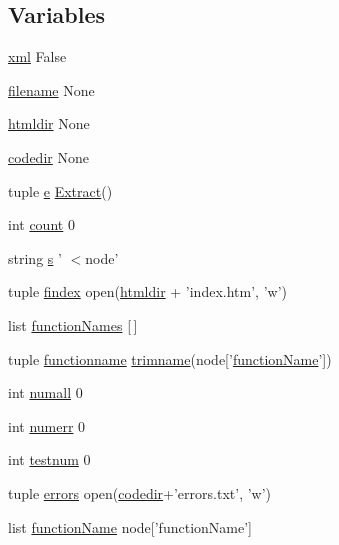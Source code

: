 \subsection*{Variables}
\begin{DoxyCompactItemize}
\item 
\hyperlink{namespaceextracttests_a6221337b9ed2dc702e37b3ecf75af370}{xml} False
\item 
\hyperlink{namespaceextracttests_ae8e72c8ddfad0acc854b69f255560652}{filename} None
\item 
\hyperlink{namespaceextracttests_a4802ed7c6c7398fd5bc6700a06be8056}{htmldir} None
\item 
\hyperlink{namespaceextracttests_a95eea71168be983462e5debd6ee1f3d8}{codedir} None
\item 
tuple \hyperlink{namespaceextracttests_a9a4c5d70c5d35e1c5a5c6963e1cc9c55}{e} \hyperlink{classextracttests_1_1_extract}{Extract}()
\item 
int \hyperlink{namespaceextracttests_afc0659f75fa16c14ec06fb99f56327ef}{count} 0
\item 
string \hyperlink{namespaceextracttests_a16068547f03c44075089cfcd0d9d384f}{s} ' $<$node'
\item 
tuple \hyperlink{namespaceextracttests_a0e689b33baed4a504201858c00f92221}{findex} open(\hyperlink{namespaceextracttests_a4802ed7c6c7398fd5bc6700a06be8056}{htmldir} + 'index.\-htm', 'w')
\item 
list \hyperlink{namespaceextracttests_a66c49796ea762e04dadfd4e147d65a9e}{function\-Names} \mbox{[}$\,$\mbox{]}
\item 
tuple \hyperlink{namespaceextracttests_afdfa35e11e3c89c35f3f921ec9f6b4f9}{functionname} \hyperlink{namespaceextracttests_a2eebad21fec29f1c277bfae0abf44fca}{trimname}(node\mbox{[}'\hyperlink{namespaceextracttests_ac1d22207f0c1a71d7f9a8e9359fae974}{function\-Name}'\mbox{]})
\item 
int \hyperlink{namespaceextracttests_ab50c99b16c07a041ebc7b644ba08958d}{numall} 0
\item 
int \hyperlink{namespaceextracttests_aadecd15e2b96e102a700da2f7e282aab}{numerr} 0
\item 
int \hyperlink{namespaceextracttests_a47e5c8f3a1b46352aed6e91bbefaed3b}{testnum} 0
\item 
tuple \hyperlink{namespaceextracttests_a9a2158d8cf259035ba3b844433a98d90}{errors} open(\hyperlink{namespaceextracttests_a95eea71168be983462e5debd6ee1f3d8}{codedir}+'errors.\-txt', 'w')
\item 
list \hyperlink{namespaceextracttests_ac1d22207f0c1a71d7f9a8e9359fae974}{function\-Name} node\mbox{[}'function\-Name'\mbox{]}

\end{DoxyCompactItemize}
